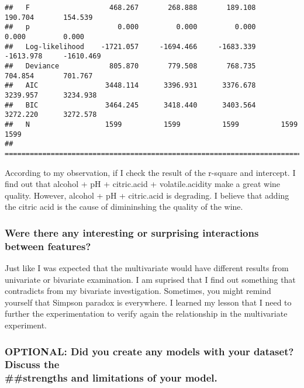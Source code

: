 \documentclass[]{article}
\begin{document}
\begin{verbatim}
##   F                   468.267       268.888       189.108       190.704       154.539     
##   p                     0.000         0.000         0.000         0.000         0.000     
##   Log-likelihood    -1721.057     -1694.466     -1683.339     -1613.978     -1610.469     
##   Deviance            805.870       779.508       768.735       704.854       701.767     
##   AIC                3448.114      3396.931      3376.678      3239.957      3234.938     
##   BIC                3464.245      3418.440      3403.564      3272.220      3272.578     
##   N                  1599          1599          1599          1599          1599         
## ==========================================================================================
\end{verbatim}

According to my observation, if I check the result of the r-square and
intercept. I find out that alcohol + pH + citric.acid + volatile.acidity
make a great wine quality. However, alcohol + pH + citric.acid is
degrading. I believe that adding the citric acid is the cause of
dimininshing the quality of the wine.

\subsubsection{Were there any interesting or surprising interactions
between
features?}\label{were-there-any-interesting-or-surprising-interactions-between-features}

Just like I was expected that the multivariate would have different
results from univariate or bivariate examination. I am suprised that I
find out something that contradicts from my bivariate investigation.
Sometimes, you might remind yourself that Simpson paradox is everywhere.
I learned my lesson that I need to further the experimentation to verify
again the relationship in the multivariate experiment.

\subsubsection{\texorpdfstring{OPTIONAL: Did you create any models with
your dataset? Discuss the\\
\#\#strengths and limitations of your
model.}{OPTIONAL: Did you create any models with your dataset? Discuss the \#\#strengths and limitations of your model.}}\label{optional-did-you-create-any-models-with-your-dataset-discuss-the-strengths-and-limitations-of-your-model.}
\end{document}
